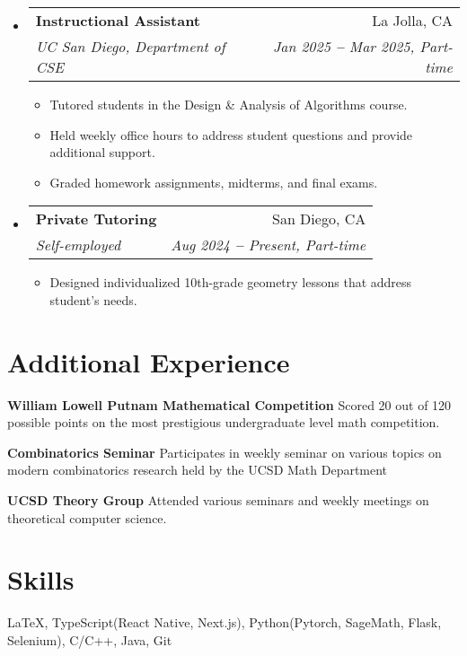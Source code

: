 \documentclass[letterpaper,11pt]{article}
\makeatletter
\newcommand{\resumeItem}[1]{
  \item\small{
    {#1 \vspace{-1pt}}
  }
}
\newcommand{\resumeSubheading}[4]{
  \vspace{-2pt}\item
    \begin{tabular*}{0.97\textwidth}[t]{l@{\extracolsep{\fill}}r}
      \textbf{#1} & #2 \\
      \textit{\small#3} & \textit{\small #4} \\
    \end{tabular*}\vspace{-2pt}
}
\newcommand{\resumeSubHeadingListStart}{\begin{itemize}[leftmargin=0.15in, label={}]}
\newcommand{\resumeSubHeadingListEnd}{\end{itemize}}
\newcommand{\resumeItemListStart}{\begin{itemize}}
\newcommand{\resumeItemListEnd}{\end{itemize}\vspace{-7pt}}
\makeatother
\begin{document}
\vspace{5pt}
  \resumeSubHeadingListStart

  \resumeSubheading
    {Instructional Assistant}{La Jolla, CA}
    {UC San Diego, Department of CSE}{Jan 2025 \textbf{--} Mar 2025, Part-time}
      \resumeItemListStart
      \resumeItem{Tutored students in the Design \& Analysis of Algorithms course.}
      \resumeItem{Held weekly office hours to address student questions and provide additional support.}
      \resumeItem{Graded homework assignments, midterms, and final exams.}
      \resumeItemListEnd

  \resumeSubheading
    {Private Tutoring}{San Diego, CA}
    {Self-employed}{Aug 2024 \textbf{--} Present, Part-time}
    \resumeItemListStart
      \resumeItem{Designed individualized 10th-grade geometry lessons that address student's needs.}
  \resumeItemListEnd

  \resumeSubHeadingListEnd


\section{Additional Experience}
  \vspace{5pt}
  \resumeSubHeadingListStart
    \small{\item{
      \textbf{William Lowell Putnam Mathematical Competition}{ Scored 20 out of 120 possible points on the most prestigious undergraduate level math competition.} \\ \vspace{5pt}
    }}
    \small{\item{
    \textbf{Combinatorics Seminar}{ Participates in weekly seminar on various topics on modern
    combinatorics research held by the UCSD Math Department} \\ \vspace{5pt}
    }}
    \small{\item{
        \textbf{UCSD Theory Group}{ Attended various seminars and weekly meetings on theoretical computer science. } \\ \vspace{5pt}
    }}
  \resumeSubHeadingListEnd


\section{Skills}
  \resumeSubHeadingListStart
    \small{\item{
    LaTeX, TypeScript(React Native, Next.js), Python(Pytorch, SageMath, Flask, Selenium), C/C++, Java, Git
    }}
  \resumeSubHeadingListEnd
\end{document}
